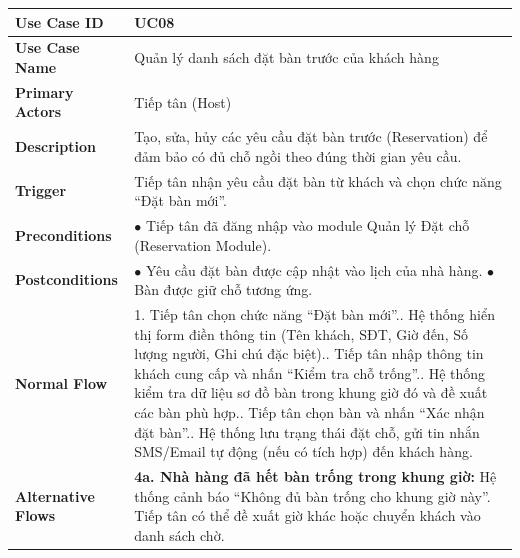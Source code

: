 \begin{longtable}{|p{3.5cm}|p{12.5cm}|}
\hline
\textbf{Use Case ID} & UC08 \\ \hline
\textbf{Use Case Name} & Quản lý danh sách đặt bàn trước của khách hàng \\ \hline
\textbf{Primary Actors} & Tiếp tân (Host) \\ \hline
\textbf{Description} & Tạo, sửa, hủy các yêu cầu đặt bàn trước (Reservation) để đảm bảo có đủ chỗ ngồi theo đúng thời gian yêu cầu. \\ \hline
\textbf{Trigger} & Tiếp tân nhận yêu cầu đặt bàn từ khách và chọn chức năng ``Đặt bàn mới''. \\ \hline
\textbf{Preconditions} & $\bullet$ Tiếp tân đã đăng nhập vào module Quản lý Đặt chỗ (Reservation Module). \\ \hline
\textbf{Postconditions} &
$\bullet$ Yêu cầu đặt bàn được cập nhật vào lịch của nhà hàng.\newline
$\bullet$ Bàn được giữ chỗ tương ứng. \\ \hline
\textbf{Normal Flow} &
1. Tiếp tân chọn chức năng ``Đặt bàn mới''.\newline
2. Hệ thống hiển thị form điền thông tin (Tên khách, SĐT, Giờ đến, Số lượng người, Ghi chú đặc biệt).\newline
3. Tiếp tân nhập thông tin khách cung cấp và nhấn ``Kiểm tra chỗ trống''.\newline
4. Hệ thống kiểm tra dữ liệu sơ đồ bàn trong khung giờ đó và đề xuất các bàn phù hợp.\newline
5. Tiếp tân chọn bàn và nhấn ``Xác nhận đặt bàn''.\newline
6. Hệ thống lưu trạng thái đặt chỗ, gửi tin nhắn SMS/Email tự động (nếu có tích hợp) đến khách hàng. \\ \hline
\textbf{Alternative Flows} &
\textbf{4a. Nhà hàng đã hết bàn trống trong khung giờ:} Hệ thống cảnh báo ``Không đủ bàn trống cho khung giờ này''. Tiếp tân có thể đề xuất giờ khác hoặc chuyển khách vào danh sách chờ. \\ \hline
\end{longtable}

